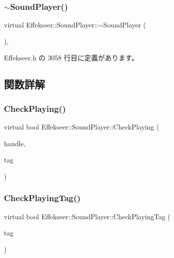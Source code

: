\subsubsection{\texorpdfstring{$\sim$\+Sound\+Player()}{~SoundPlayer()}}
{\footnotesize\ttfamily virtual Effekseer\+::\+Sound\+Player\+::$\sim$\+Sound\+Player (\begin{DoxyParamCaption}{ }\end{DoxyParamCaption})\hspace{0.3cm}{\ttfamily [inline]}, {\ttfamily [virtual]}}



 Effekseer.\+h の 3058 行目に定義があります。



\subsection{関数詳解}
\mbox{\label{class_effekseer_1_1_sound_player_a046be0da01c515b38b92d792108441b6}} 
\subsubsection{\texorpdfstring{Check\+Playing()}{CheckPlaying()}}
{\footnotesize\ttfamily virtual bool Effekseer\+::\+Sound\+Player\+::\+Check\+Playing (\begin{DoxyParamCaption}\item[{\mbox{\hyperlink{namespace_effekseer_a694a300b9b688ca40f6a0d9841d437bf}{Sound\+Handle}}}]{handle,  }\item[{\mbox{\hyperlink{namespace_effekseer_adb219197297396cf2ab9bee657551a29}{Sound\+Tag}}}]{tag }\end{DoxyParamCaption})\hspace{0.3cm}{\ttfamily [pure virtual]}}

\mbox{\label{class_effekseer_1_1_sound_player_a12a4c022f15f7a8a9d3e3235a351606c}} 
\subsubsection{\texorpdfstring{Check\+Playing\+Tag()}{CheckPlayingTag()}}
{\footnotesize\ttfamily virtual bool Effekseer\+::\+Sound\+Player\+::\+Check\+Playing\+Tag (\begin{DoxyParamCaption}\item[{\mbox{\hyperlink{namespace_effekseer_adb219197297396cf2ab9bee657551a29}{Sound\+Tag}}}]{tag }\end{DoxyParamCaption})\hspace{0.3cm}{\ttfamily [pure virtual]}}

